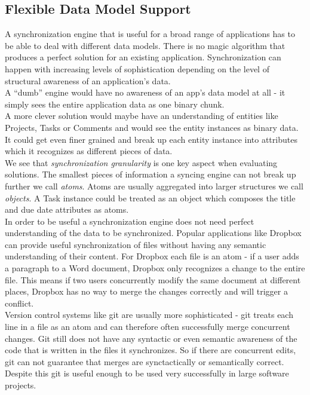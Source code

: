 \subsection{Flexible Data Model Support}
A synchronization engine that is useful for a broad range of applications has to be able to deal with different data models. There is no magic algorithm that produces a perfect solution for an existing application.
Synchronization can happen with increasing levels of sophistication depending on the level of structural awareness of an application's data.\\
A ``dumb'' engine would have no awareness of an app's data model at all - it simply sees the entire application data as one binary chunk.\\
A more clever solution would maybe have an understanding of entities like Projects, Tasks or Comments and would see the entity instances as binary data.\\
It could get even finer grained and break up each entity instance into attributes which it recognizes as different pieces of data.\\
We see that \emph{synchronization granularity} is one key aspect when evaluating solutions.
The smallest pieces of information a syncing engine can not break up further we call \emph{atoms}.
Atoms are usually aggregated into larger structures we call \emph{objects}.
A Task instance could be treated as an object which composes the title and due date attributes as atoms.\\
In order to be useful a synchronization engine does not need perfect understanding of the data to be synchronized.
Popular applications like Dropbox can provide useful synchronization of files without having any semantic understanding of their content.
For Dropbox each file is an atom - if a user adds a paragraph to a Word document, Dropbox only recognizes a change to the entire file.
This means if two users concurrently modify the same document at different places, Dropbox has no way to merge the changes correctly and will trigger a conflict.\\
Version control systems like git are usually more sophisticated - git treats each line in a file as an atom and can therefore often successfully merge concurrent changes.
Git still does not have any syntactic or even semantic awareness of the code that is written in the files it synchronizes.
So if there are concurrent edits, git can not guarantee that merges are synctactically or semantically correct.
Despite this git is useful enough to be used very successfully in large software projects.\\


